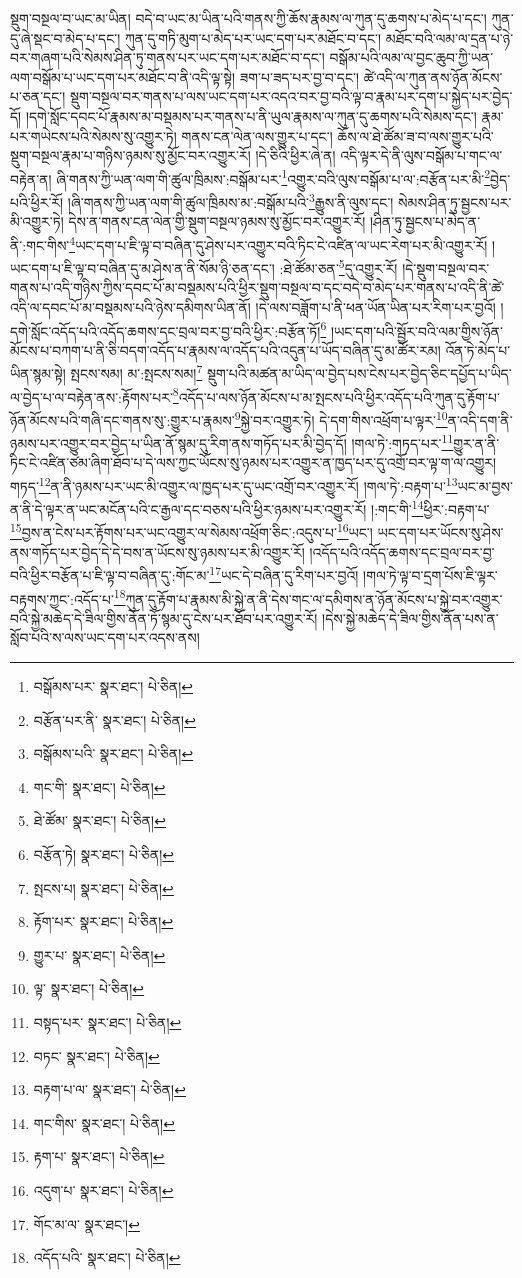 སྡུག་བསྔལ་བ་ཡང་མ་ཡིན། བདེ་བ་ཡང་མ་ཡིན་པའི་གནས་ཀྱི་ཆོས་རྣམས་ལ་ཀུན་དུ་ཆགས་པ་མེད་པ་དང་། ཀུན་དུ་ཞེ་སྡང་བ་མེད་པ་དང་། ཀུན་དུ་གཏི་མུག་པ་མེད་པར་ཡང་དག་པར་མཐོང་བ་དང་། མཐོང་བའི་ལམ་ལ་དྲན་པ་ཉེ་བར་གཞག་པའི་སེམས་ཤིན་ཏུ་གནས་པར་ཡང་དག་པར་མཐོང་བ་དང་། བསྒོམ་པའི་ལམ་ལ་བྱང་ཆུབ་ཀྱི་ཡན་ལག་བསྒོམ་པ་ཡང་དག་པར་མཐོང་བ་ནི་འདི་ལྟ་སྟེ། ཟག་པ་ཟད་པར་བྱ་བ་དང་། ཚེ་འདི་ལ་ཀུན་ནས་ཉོན་མོངས་པ་ཅན་དང་། སྡུག་བསྔལ་བར་གནས་པ་ལས་ཡང་དག་པར་འདའ་བར་བྱ་བའི་ལྟ་བ་རྣམ་པར་དག་པ་སྐྱེད་པར་བྱེད་དོ། །དགེ་སློང་དབང་པོ་རྣམས་མ་བསྡམས་པར་གནས་པ་ནི་ཡུལ་རྣམས་ལ་ཀུན་དུ་ཆགས་པའི་སེམས་དང་། རྣམ་པར་གཡེངས་པའི་སེམས་སུ་འགྱུར་ཏེ། གནས་ངན་ལེན་ལས་གྱུར་པ་དང་། ཆོས་ལ་ཐེ་ཚོམ་ཟ་བ་ལས་གྱུར་པའི་སྡུག་བསྔལ་རྣམ་པ་གཉིས་ཉམས་སུ་མྱོང་བར་འགྱུར་རོ། །དེ་ཅིའི་ཕྱིར་ཞེ་ན། འདི་ལྟར་དེ་ནི་ལུས་བསྒོམ་པ་གང་ལ་བརྟེན་ན། ཞི་གནས་ཀྱི་ཡན་ལག་གི་ཚུལ་ཁྲིམས་:བསྒོམ་པར་\footnote{བསྒོམས་པར་  སྣར་ཐང་།  པེ་ཅིན། }འགྱུར་བའི་ལུས་བསྒོམ་པ་ལ་:བརྩོན་པར་མི་\footnote{བརྩོན་པར་ནི་  སྣར་ཐང་།  པེ་ཅིན། }བྱེད་པའི་ཕྱིར་རོ། །ཞི་གནས་ཀྱི་ཡན་ལག་གི་ཚུལ་ཁྲིམས་མ་:བསྒོམ་པའི་\footnote{བསྒོམས་པའི་  སྣར་ཐང་།  པེ་ཅིན། }རྒྱུས་ནི་ལུས་དང་། སེམས་ཤིན་ཏུ་སྦྱངས་པར་མི་འགྱུར་ཏེ། དེས་ན་གནས་ངན་ལེན་གྱི་སྡུག་བསྔལ་ཉམས་སུ་མྱོང་བར་འགྱུར་རོ། །ཤིན་ཏུ་སྦྱངས་པ་མེད་ན་ནི་:གང་གིས་\footnote{གང་གི་  སྣར་ཐང་།  པེ་ཅིན། }ཡང་དག་པ་ཇི་ལྟ་བ་བཞིན་དུ་ཤེས་པར་འགྱུར་བའི་ཏིང་ངེ་འཛིན་ལ་ཡང་རེག་པར་མི་འགྱུར་རོ། །ཡང་དག་པ་ཇི་ལྟ་བ་བཞིན་དུ་མ་ཤེས་ན་ནི་སོམ་ཉི་ཅན་དང་། :ཐེ་ཚོམ་ཅན་\footnote{ཐེ་ཚོམ་  སྣར་ཐང་།  པེ་ཅིན། }དུ་འགྱུར་རོ། །དེ་སྡུག་བསྔལ་བར་གནས་པ་འདི་གཉིས་ཀྱིས་དབང་པོ་མ་བསྡམས་པའི་ཕྱིར་སྡུག་བསྔལ་བ་དང་བདེ་བ་མེད་པར་གནས་པ་འདི་ནི་ཚེ་འདི་ལ་དབང་པོ་མ་བསྡམས་པའི་ཉེས་དམིགས་ཡིན་ནོ། །དེ་ལས་བཟློག་པ་ནི་ཕན་ཡོན་ཡིན་པར་རིག་པར་བྱའོ། །དགེ་སློང་འདོད་པའི་འདོད་ཆགས་དང་བྲལ་བར་བྱ་བའི་ཕྱིར་:བརྩོན་ཏོ།\footnote{བརྩོན་ཏེ།  སྣར་ཐང་།  པེ་ཅིན། } །ཡང་དག་པའི་སྦྱོར་བའི་ལམ་གྱིས་ཉོན་མོངས་པ་བཀག་པ་ནི་ཅི་བདག་འདོད་པ་རྣམས་ལ་འདོད་པའི་འདུན་པ་ཡོད་བཞིན་དུ་མ་ཚོར་རམ། འོན་ཏེ་མེད་པ་ཡིན་སྙམ་སྟེ། སྤངས་སམ། མ་:སྤངས་སམ།\footnote{སྤངས་པ།  སྣར་ཐང་།  པེ་ཅིན། } སྡུག་པའི་མཚན་མ་ཡིད་ལ་བྱེད་པས་ངེས་པར་བྱེད་ཅིང་དཔྱོད་པ་ཡིད་ལ་བྱེད་པ་ལ་བརྟེན་ནས་:རྟོགས་པར་\footnote{རྟོག་པར་  སྣར་ཐང་།  པེ་ཅིན། }འདོད་པ་ལས་ཉོན་མོངས་པ་མ་སྤངས་པའི་ཕྱིར་འདོད་པའི་ཀུན་དུ་རྟོག་པ་ཉོན་མོངས་པའི་གཞི་དང་གནས་སུ་:གྱུར་པ་རྣམས་\footnote{གྱུར་པ་  སྣར་ཐང་།  པེ་ཅིན། }སྐྱེ་བར་འགྱུར་ཏེ། དེ་དག་གིས་འཕྲོག་པ་ལྟར་\footnote{ལྟ་  སྣར་ཐང་།  པེ་ཅིན། }ན་འདི་དག་ནི་ཉམས་པར་འགྱུར་བར་བྱེད་པ་ཡིན་ནོ་སྙམ་དུ་རིག་ནས་གཏོད་པར་མི་བྱེད་དོ། །གལ་ཏེ་:གཏད་པར་\footnote{བསྟད་པར་  སྣར་ཐང་།  པེ་ཅིན། }གྱུར་ན་ནི་ཏིང་ངེ་འཛིན་ཙམ་ཞིག་ཐོབ་པ་དེ་ལས་ཀྱང་ཡོངས་སུ་ཉམས་པར་འགྱུར་ན་ཁྱད་པར་དུ་འགྲོ་བར་ལྟ་ག་ལ་འགྱུར། གཏད་\footnote{བཏང་  སྣར་ཐང་།  པེ་ཅིན། }ན་ནི་ཉམས་པར་ཡང་མི་འགྱུར་ལ་ཁྱད་པར་དུ་ཡང་འགྲོ་བར་འགྱུར་རོ། །གལ་ཏེ་:བརྟག་པ་\footnote{བརྟག་པ་ལ་  སྣར་ཐང་།  པེ་ཅིན། }ཡང་མ་བྱས་ན་ནི་དེ་ལྟར་ན་ཡང་མངོན་པའི་ང་རྒྱལ་དང་བཅས་པའི་ཕྱིར་ཉམས་པར་འགྱུར་རོ། །:གང་གི་\footnote{གང་གིས་  སྣར་ཐང་།  པེ་ཅིན། }ཕྱིར་:བརྟག་པ་\footnote{རྟག་པ་  སྣར་ཐང་།  པེ་ཅིན། }བྱས་ན་ངེས་པར་རྟོགས་པར་ཡང་འགྱུར་ལ་སེམས་འཕྲོག་ཅིང་:འདུས་པ་\footnote{འདུག་པ་  སྣར་ཐང་།  པེ་ཅིན། }ཡང་། ཡང་དག་པར་ཡོངས་སུ་ཤེས་ནས་གཏོད་པར་བྱེད་དེ་དེ་བས་ན་ཡོངས་སུ་ཉམས་པར་མི་འགྱུར་རོ། །འདོད་པའི་འདོད་ཆགས་དང་བྲལ་བར་བྱ་བའི་ཕྱིར་བརྩོན་པ་ཇི་ལྟ་བ་བཞིན་དུ་:གོང་མ་\footnote{གོང་མ་ལ་  སྣར་ཐང་། }ཡང་དེ་བཞིན་དུ་རིག་པར་བྱའོ། །གལ་ཏེ་ལྟ་བ་དྲག་པོས་ཇི་ལྟར་བརྟགས་ཀྱང་:འདོད་པ་\footnote{འདོད་པའི་  སྣར་ཐང་།  པེ་ཅིན། }ཀུན་དུ་རྟོག་པ་རྣམས་མི་སྐྱེ་ན་ནི་དེས་གང་ལ་དམིགས་ན་ཉོན་མོངས་པ་སྐྱེ་བར་འགྱུར་བའི་སྐྱེ་མཆེད་དེ་ཟིལ་གྱིས་ནོན་ཏོ་སྙམ་དུ་ངེས་པར་ཐོབ་པར་འགྱུར་རོ། །དེས་སྐྱེ་མཆེད་དེ་ཟིལ་གྱིས་ནོན་པས་ན་སློབ་པའི་ས་ལས་ཡང་དག་པར་འདས་ནས། 